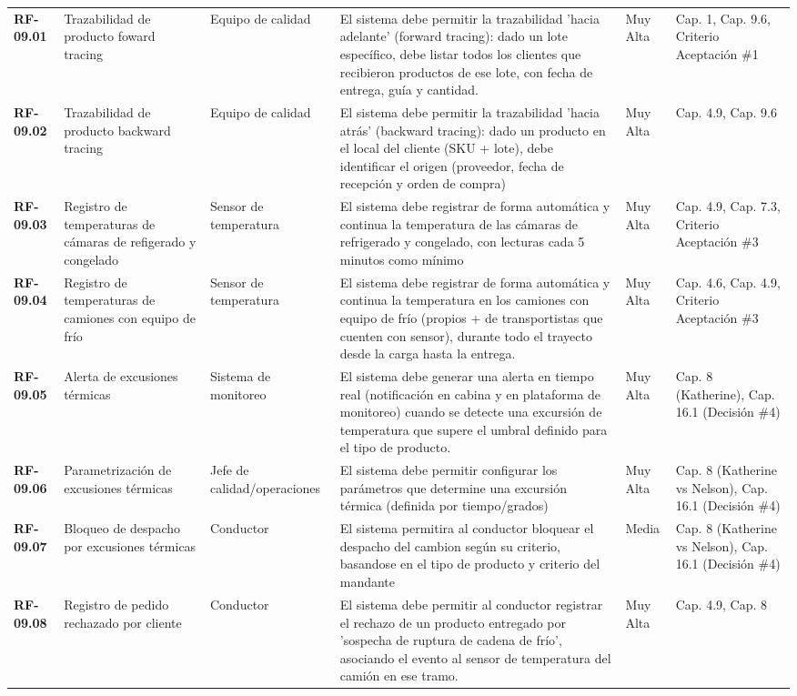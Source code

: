 \begin{longtable}{p{1.7cm} p{2.3cm} p{1.9cm} p{5.0cm} p{1.1cm} p{1.9cm}}
\textbf{RF-09.01} & Trazabilidad de producto foward tracing & Equipo de calidad & El sistema debe permitir la trazabilidad 'hacia adelante' (forward tracing): dado un lote específico, debe listar todos los clientes que recibieron productos de ese lote, con fecha de entrega, guía y cantidad. & Muy Alta & Cap. 1, Cap. 9.6, Criterio Aceptación \#1 \\
\textbf{RF-09.02} & Trazabilidad de producto backward tracing & Equipo de calidad & El sistema debe permitir la trazabilidad 'hacia atrás' (backward tracing): dado un producto en el local del cliente (SKU + lote), debe identificar el origen (proveedor, fecha de recepción y orden de compra) & Muy Alta & Cap. 4.9, Cap. 9.6 \\
\textbf{RF-09.03} & Registro de temperaturas de cámaras de refigerado y congelado & Sensor de temperatura & El sistema debe registrar de forma automática y continua la temperatura de las cámaras de refrigerado y congelado, con lecturas cada 5 minutos como mínimo & Muy Alta & Cap. 4.9, Cap. 7.3, Criterio Aceptación \#3 \\
\textbf{RF-09.04} & Registro de temperaturas de camiones con equipo de frío & Sensor de temperatura & El sistema debe registrar de forma automática y continua la temperatura en los camiones con equipo de frío (propios + de transportistas que cuenten con sensor), durante todo el trayecto desde la carga hasta la entrega. & Muy Alta & Cap. 4.6, Cap. 4.9, Criterio Aceptación \#3 \\
\textbf{RF-09.05} & Alerta de excusiones térmicas & Sistema de monitoreo & El sistema debe generar una alerta en tiempo real (notificación en cabina y en plataforma de monitoreo) cuando se detecte una excursión de temperatura que supere el umbral definido para el tipo de producto. & Muy Alta & Cap. 8 (Katherine), Cap. 16.1 (Decisión \#4) \\
\textbf{RF-09.06} & Parametrización de excusiones térmicas & Jefe de calidad/operaciones & El sistema debe permitir configurar los parámetros que determine una excursión térmica (definida por tiempo/grados) & Muy Alta & Cap. 8 (Katherine vs Nelson), Cap. 16.1 (Decisión \#4) \\
\textbf{RF-09.07} & Bloqueo de despacho por excusiones térmicas & Conductor & El sistema permitira al conductor bloquear el despacho del cambion según su criterio, basandose en el tipo de producto y criterio del mandante & Media & Cap. 8 (Katherine vs Nelson), Cap. 16.1 (Decisión \#4) \\
\textbf{RF-09.08} & Registro de pedido rechazado por cliente & Conductor & El sistema debe permitir al conductor registrar el rechazo de un producto entregado por 'sospecha de ruptura de cadena de frío', asociando el evento al sensor de temperatura del camión en ese tramo. & Muy Alta & Cap. 4.9, Cap. 8 \\

\end{longtable}
